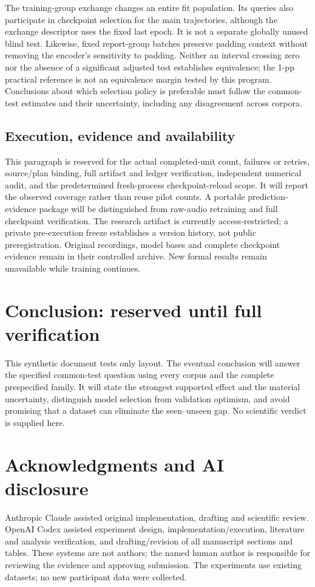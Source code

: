 \documentclass[letterpaper]{article}
\begin{document}
The training-group exchange changes an entire fit population. Its queries also participate in checkpoint selection for the main trajectories, although the exchange descriptor uses the fixed last epoch. It is not a separate globally unused blind test. Likewise, fixed report-group batches preserve padding context without removing the encoder's sensitivity to padding. Neither an interval crossing zero nor the absence of a significant adjusted test establishes equivalence; the 1-pp practical reference is not an equivalence margin tested by this program. Conclusions about which selection policy is preferable must follow the common-test estimates and their uncertainty, including any disagreement across corpora.

\subsection{Execution, evidence and availability}
This paragraph is reserved for the actual completed-unit count, failures or retries, source/plan binding, full artifact and ledger verification, independent numerical audit, and the predetermined fresh-process checkpoint-reload scope. It will report the observed coverage rather than reuse pilot counts. A portable prediction-evidence package will be distinguished from raw-audio retraining and full checkpoint verification. The research artifact is currently access-restricted; a private pre-execution freeze establishes a version history, not public preregistration. Original recordings, model bases and complete checkpoint evidence remain in their controlled archive. New formal results remain unavailable while training continues.

\section{Conclusion: reserved until full verification}
This synthetic document tests only layout. The eventual conclusion will answer the specified common-test question using every corpus and the complete prespecified family. It will state the strongest supported effect and the material uncertainty, distinguish model selection from validation optimism, and avoid promising that a dataset can eliminate the seen--unseen gap. No scientific verdict is supplied here.

\section{Acknowledgments and AI disclosure}
Anthropic Claude assisted original implementation, drafting and scientific review. OpenAI Codex assisted experiment design, implementation/execution, literature and analysis verification, and drafting/revision of all manuscript sections and tables. These systems are not authors; the named human author is responsible for reviewing the evidence and approving submission. The experiments use existing datasets; no new participant data were collected.
\end{document}
